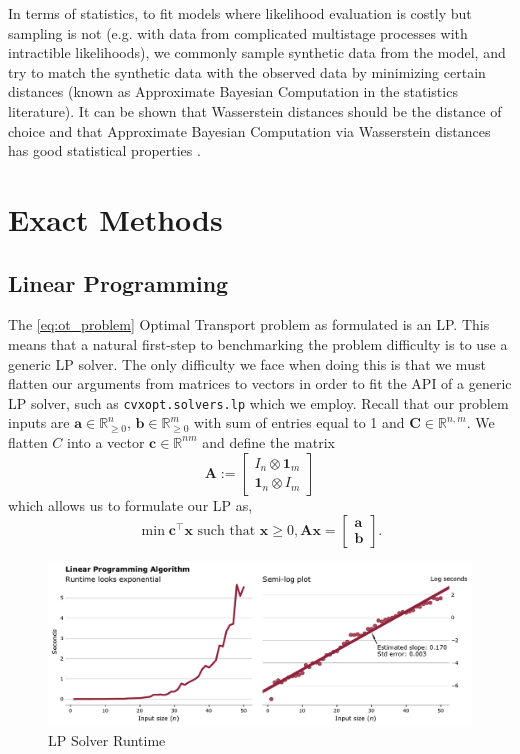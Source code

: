 \documentclass{article}
\theoremstyle{definition}
\theoremstyle{remark}
\begin{document}
In terms of statistics, to fit models where likelihood evaluation is costly
 but
 sampling is not (e.g. with data from complicated multistage processes with
 intractible likelihoods), we commonly sample synthetic data from the model, and
 try to match the synthetic data with the observed data by minimizing certain
 distances (known as Approximate Bayesian Computation in the statistics
 literature).
It can be shown that Wasserstein distances should be the distance of choice and
 that Approximate Bayesian Computation via Wasserstein distances has good
 statistical properties \cite{bernton2017inference}.


\section{Exact Methods}
\label{sec:exact}

\subsection{Linear Programming} %
\label{sub:linear_programming}

The \ref{eq:ot_problem} Optimal Transport problem as formulated is an LP. This
means that a natural first-step to benchmarking the problem difficulty is to use
a generic LP solver. The only difficulty we face when doing this is that we must
flatten our arguments from matrices to vectors in order to fit the API of a
generic LP solver, such as \texttt{cvxopt.solvers.lp} which we employ. Recall
that our problem inputs are $\mathbf{a} \in \mathbb{R}^n_{\ge 0}$, $\mathbf{b}
\in \mathbb{R}^m_{\ge 0}$ with sum of entries equal to 1 and $\mathbf{C} \in
\mathbb{R}^{n,m}$. We flatten $C$ into a vector $\mathbf{c} \in \mathbb{R}^{nm}$
and define the matrix
\[ \mathbf{A} := \begin{bmatrix} I_n \otimes \mathbf{1}_m \\ \mathbf{1}_n
\otimes I_m \end{bmatrix} \]
which allows us to formulate our LP as,
\[ \min \mathbf{c}^\top \mathbf{x} \text{ such that } \mathbf{x} \ge 0,
\mathbf{A} \mathbf{x} = \begin{bmatrix} \mathbf{a} \\ \mathbf{b}
\end{bmatrix}.\]

\begin{figure}[b]
\includegraphics[width=\textwidth]{../../code/lpruntime}
\caption{LP Solver Runtime}
\label{fig:lpruntime}
\end{figure}
\end{document}
